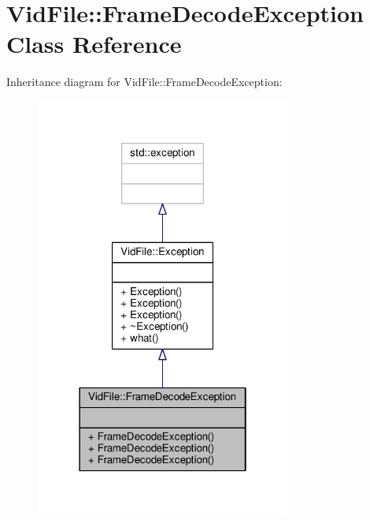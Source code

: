 \hypertarget{classVidFile_1_1FrameDecodeException}{}\section{Vid\+File\+:\+:Frame\+Decode\+Exception Class Reference}
\label{classVidFile_1_1FrameDecodeException}


Inheritance diagram for Vid\+File\+:\+:Frame\+Decode\+Exception\+:
\nopagebreak
\begin{figure}[H]
\begin{center}
\leavevmode
\includegraphics[width=238pt]{d6/dc5/classVidFile_1_1FrameDecodeException__inherit__graph}
\end{center}
\end{figure}


